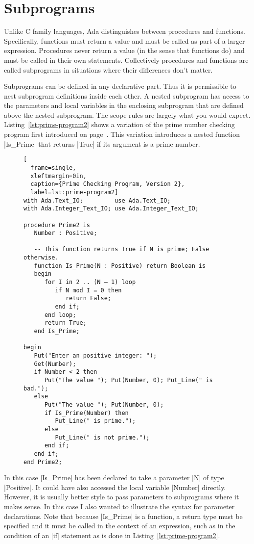 \section{Subprograms}

Unlike C family languages, Ada distinguishes between procedures and functions. Specifically,
functions must return a value and must be called as part of a larger expression. Procedures
never return a value (in the sense that functions do) and must be called in their own
statements. Collectively procedures and functions are called subprograms in situations where
their differences don't matter.

Subprograms can be defined in any declarative part. Thus it is permissible to nest subprogram
definitions inside each other. A nested subprogram has access to the parameters and local
variables in the enclosing subprogram that are defined above the nested subprogram. The scope
rules are largely what you would expect. Listing~\ref{lst:prime-program2} shows a variation of
the prime number checking program first introduced on page~\pageref{lst:prime-program}. This
variation introduces a nested function |Is_Prime| that returns |True| if its argument is a prime
number.

\begin{figure}[tbhp]
\begin{lstlisting}[
  frame=single,
  xleftmargin=0in,
  caption={Prime Checking Program, Version 2},
  label=lst:prime-program2]
with Ada.Text_IO;         use Ada.Text_IO;
with Ada.Integer_Text_IO; use Ada.Integer_Text_IO;

procedure Prime2 is
   Number : Positive;

   -- This function returns True if N is prime; False otherwise.
   function Is_Prime(N : Positive) return Boolean is
   begin
      for I in 2 .. (N – 1) loop
         if N mod I = 0 then
            return False;
         end if;
      end loop;
      return True;
   end Is_Prime;

begin
   Put("Enter an positive integer: ");
   Get(Number);
   if Number < 2 then
      Put("The value "); Put(Number, 0); Put_Line(" is bad.");
   else
      Put("The value "); Put(Number, 0);
      if Is_Prime(Number) then
         Put_Line(" is prime.");
      else
         Put_Line(" is not prime.");
      end if;
   end if;
end Prime2;
\end{lstlisting}
\end{figure}

In this case |Is_Prime| has been declared to take a parameter |N| of type |Positive|. It could
have also accessed the local variable |Number| directly. However, it is usually better style to
pass parameters to subprograms where it makes sense. In this case I also wanted to illustrate
the syntax for parameter declarations. Note that because |Is_Prime| is a function, a return type
must be specified and it must be called in the context of an expression, such as in the
condition of an |if| statement as is done in Listing~\ref{lst:prime-program2}.

